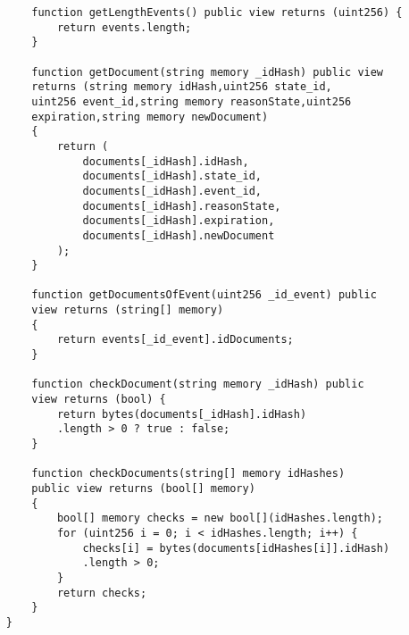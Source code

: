 \begin{verbatim}
        function getLengthEvents() public view returns (uint256) {
            return events.length;
        }
    
        function getDocument(string memory _idHash) public view 
        returns (string memory idHash,uint256 state_id,
        uint256 event_id,string memory reasonState,uint256 
        expiration,string memory newDocument)
        {
            return (
                documents[_idHash].idHash,
                documents[_idHash].state_id,
                documents[_idHash].event_id,
                documents[_idHash].reasonState,
                documents[_idHash].expiration,
                documents[_idHash].newDocument
            );
        }
    
        function getDocumentsOfEvent(uint256 _id_event) public 
        view returns (string[] memory)
        {
            return events[_id_event].idDocuments;
        }
    
        function checkDocument(string memory _idHash) public 
        view returns (bool) {
            return bytes(documents[_idHash].idHash)
            .length > 0 ? true : false;
        }
    
        function checkDocuments(string[] memory idHashes) 
        public view returns (bool[] memory)
        {
            bool[] memory checks = new bool[](idHashes.length);
            for (uint256 i = 0; i < idHashes.length; i++) {
                checks[i] = bytes(documents[idHashes[i]].idHash)
                .length > 0;
            }
            return checks;
        }
    }
    
    
\end{verbatim}